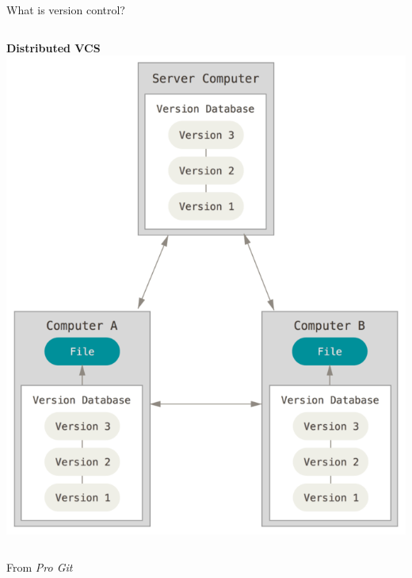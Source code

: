 \begin{frame}{What is version control?}
{\begin{columns}
\begin{column}{0.5\textwidth}
                \centering
                \textbf{Distributed VCS} \\[\bigskipamount]
                \includegraphics[height=0.6\textheight]{figures/distributed_vcs} \\
            \end{column}
        \end{columns}
        \vfill
        \begin{center}
            {\scriptsize%
             From \textit{Pro Git}}
            \vspace{-3em}
        \end{center}}
\end{frame}

